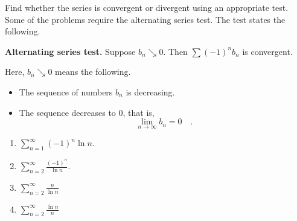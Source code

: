 Find whether the series is convergent or divergent using an
appropriate test. Some of the problems require the alternating series test. The test states the following.

\medskip

{\textbf{Alternating series test.} Suppose $b_n \searrow 0$. Then $\sum (-1)^n b_n$ is convergent.} 

\medskip

Here, $b_n\searrow 0$ means the following.
\begin{itemize}
\item The sequence of numbers $b_n$ is decreasing.
\item The sequence decreases to $0$, that is, 
\[\lim\limits_{n\to \infty} b_n=0\quad .
\]
\end{itemize}
%
\begin{multicols}{2}
\begin{enumerate}[ref={\fcProblemRef}]
\item \label{problemConvergencesumn=1^infty(-1)^nlnn} $\displaystyle\sum_{n=1}^{\infty} (-1)^n\ln n  . $

\item \label{problemConvergencesumn=2^infty(-1)^n/lnn} $\displaystyle \sum_{n=2}^{\infty} \frac{(-1)^n }{\ln n}  .$

\item \label{problemConvergencesum_n=2^infty(-1)^nn/ln(n)} $\displaystyle \sum\limits_{n=2}^{\infty}\frac{n}{\ln n}$

\item \label{problemConvergencesum_n=2^infty(-1)^nln(n)/n} $\displaystyle \sum\limits_{n=2}^{\infty}\frac{\ln n}{n}$

\end{enumerate}
\end{multicols}